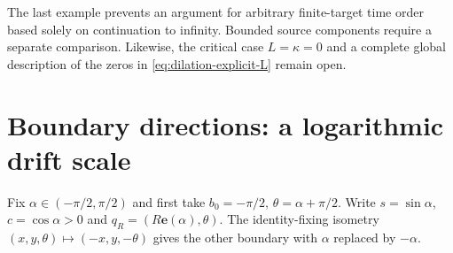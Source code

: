 \documentclass[11pt,a4paper]{article}
\theoremstyle{remark}\newtheorem{remark}[theorem]{Remark}
\newcommand{\ee}{\mathbf e}
\begin{document}
The last example prevents an argument for arbitrary finite-target time
order based solely on continuation to infinity. Bounded source components
require a separate comparison. Likewise, the critical case $L=\kappa=0$
and a complete global description of the zeros in
\eqref{eq:dilation-explicit-L} remain open.

\section{Boundary directions: a logarithmic drift scale}\label{sec:boundary}

Fix $\alpha\in(-\pi/2,\pi/2)$ and first take
$b_0=-\pi/2$, $\theta=\alpha+\pi/2$.
Write $s=\sin\alpha$, $c=\cos\alpha>0$ and $q_R=(R\ee(\alpha),\theta)$.
The identity-fixing isometry $(x,y,\theta)\mapsto(-x,y,-\theta)$
gives the other boundary with $\alpha$ replaced by $-\alpha$.
\end{document}
